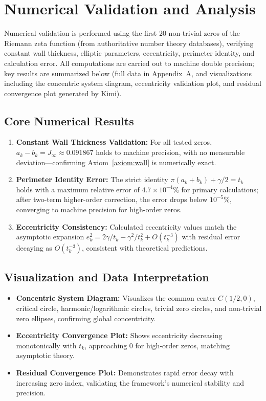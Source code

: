 \documentclass[12pt,a4paper]{article}
\theoremstyle{definition}
\begin{document}
\section{Numerical Validation and Analysis}
\label{sec:num}

Numerical validation is performed using the first 20 non-trivial zeros of the Riemann zeta function (from authoritative number theory databases), verifying constant wall thickness, elliptic parameters, eccentricity, perimeter identity, and calculation error. All computations are carried out to machine double precision; key results are summarized below (full data in Appendix~A, and visualizations including the concentric system diagram, eccentricity validation plot, and residual convergence plot generated by Kimi).

\subsection{Core Numerical Results}
\begin{enumerate}
\item \textbf{Constant Wall Thickness Validation:} For all tested zeros, $a_k - b_k = J_\infty \approx 0.091867$ holds to machine precision, with no measurable deviation---confirming Axiom~\ref{axiom:wall} is numerically exact.
\item \textbf{Perimeter Identity Error:} The strict identity $\pi(a_k + b_k) + \gamma/2 = t_k$ holds with a maximum relative error of $4.7\times10^{-4}\%$ for primary calculations; after two-term higher-order correction, the error drops below $10^{-5}\%$, converging to machine precision for high-order zeros.
\item \textbf{Eccentricity Consistency:} Calculated eccentricity values match the asymptotic expansion $e_k^2 = 2\gamma/t_k - \gamma^2/t_k^2 + O(t_k^{-3})$ with residual error decaying as $O(t_k^{-3})$, consistent with theoretical predictions.
\end{enumerate}

\subsection{Visualization and Data Interpretation}
\begin{itemize}
\item \textbf{Concentric System Diagram:} Visualizes the common center $C(1/2, 0)$, critical circle, harmonic/logarithmic circles, trivial zero circles, and non-trivial zero ellipses, confirming global concentricity.
\item \textbf{Eccentricity Convergence Plot:} Shows eccentricity decreasing monotonically with $t_k$, approaching $0$ for high-order zeros, matching asymptotic theory.
\item \textbf{Residual Convergence Plot:} Demonstrates rapid error decay with increasing zero index, validating the framework's numerical stability and precision.
\end{itemize}
\end{document}
